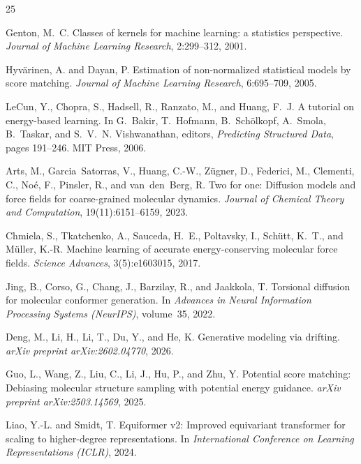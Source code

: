 \documentclass[11pt]{article}
\begin{document}
\begin{thebibliography}{25}

Genton, M.~C.
\newblock Classes of kernels for machine learning: a statistics perspective.
\newblock \emph{Journal of Machine Learning Research}, 2:299--312, 2001.

Hyvärinen, A. and Dayan, P.
\newblock Estimation of non-normalized statistical models by score matching.
\newblock \emph{Journal of Machine Learning Research}, 6:695--709, 2005.

LeCun, Y., Chopra, S., Hadsell, R., Ranzato, M., and Huang, F.~J.
\newblock A tutorial on energy-based learning.
\newblock In G.~Bakir, T.~Hofmann, B.~Schölkopf, A.~Smola, B.~Taskar, and S.~V.~N.
Vishwanathan, editors, \emph{Predicting Structured Data}, pages 191--246. MIT Press, 2006.

Arts, M., Garcia~Satorras, V., Huang, C.-W., Zügner, D., Federici, M., Clementi, C., Noé, F., Pinsler, R., and van~den~Berg, R.
\newblock Two for one: Diffusion models and force fields for coarse-grained molecular dynamics.
\newblock \emph{Journal of Chemical Theory and Computation}, 19(11):6151--6159, 2023.

Chmiela, S., Tkatchenko, A., Sauceda, H.~E., Poltavsky, I., Schütt, K.~T., and Müller, K.-R.
\newblock Machine learning of accurate energy-conserving molecular force fields.
\newblock \emph{Science Advances}, 3(5):e1603015, 2017.

Jing, B., Corso, G., Chang, J., Barzilay, R., and Jaakkola, T.
\newblock Torsional diffusion for molecular conformer generation.
\newblock In \emph{Advances in Neural Information Processing Systems (NeurIPS)}, volume~35, 2022.

Deng, M., Li, H., Li, T., Du, Y., and He, K.
\newblock Generative modeling via drifting.
\newblock \emph{arXiv preprint arXiv:2602.04770}, 2026.

Guo, L., Wang, Z., Liu, C., Li, J., Hu, P., and Zhu, Y.
\newblock Potential score matching: Debiasing molecular structure sampling with potential energy guidance.
\newblock \emph{arXiv preprint arXiv:2503.14569}, 2025.

Liao, Y.-L. and Smidt, T.
\newblock Equiformer v2: Improved equivariant transformer for scaling to higher-degree representations.
\newblock In \emph{International Conference on Learning Representations (ICLR)}, 2024.


\end{thebibliography}
\end{document}
